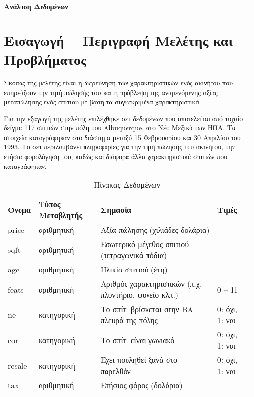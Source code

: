 \documentclass[
  10pt,
]{article}
\author{}
\date{\vspace{-2.5em}}
\begin{document}
\begin{titlepage}
  \centering
  \vspace*{2cm}
  
  {\Huge\bfseries Ανάλυση Δεδομένων\par}
  \vspace{1.5cm}

  \vfill
\end{titlepage}

\section*{Εισαγωγή – Περιγραφή Μελέτης και Προβλήματος}

Σκοπός της μελέτης είναι η διερεύνηση των χαρακτηριστικών ενός ακινήτου
που επηρεάζουν την τιμή πώλησής του και η πρόβλεψη της αναμενόμενης
αξίας μεταπώλησης ενός σπιτιού με βάση τα συγκεκριμένα χαρακτηριστικά.

Για την εξαγωγή της μελέτης επιλέχθηκε σετ δεδομένων που αποτελείται από
τυχαίο δείγμα 117 σπιτιών στην πόλη του Albuquerque, στο Νέο Μεξικό των
ΗΠΑ. Τα στοιχεία καταγράφηκαν στο διάστημα μεταξύ 15 Φεβρουαρίου και 30
Απριλίου του 1993. Το σετ περιλαμβάνει πληροφορίες για την τιμή πώλησης
του ακινήτου, την ετήσια φορολόγηση του, καθώς και διάφορα άλλα
χαρακτηριστικά σπιτιών που καταγράφηκαν.

\begin{longtable}[t]{llll}
\caption{\label{tab:unnamed-chunk-1}Πίνακας Δεδομένων}\\
\toprule
\textbf{Όνομα} & \textbf{Τύπος Μεταβλητής} & \textbf{Σημασία} & \textbf{Τιμές}\\
\midrule
price & αριθμητική & Αξία πώλησης (χιλιάδες δολάρια) & \\
sqft & αριθμητική & Εσωτερικό μέγεθος σπιτιού (τετραγωνικά πόδια) & \\
age & αριθμητική & Ηλικία σπιτιού (έτη) & \\
feats & αριθμητική & Αριθμός χαρακτηριστικών (π.χ. πλυντήριο, ψυγείο κλπ.) & 0 – 11\\
ne & κατηγορική & Το σπίτι βρίσκεται στην ΒΑ πλευρά της πόλης & 0: όχι, 1: ναι\\
\addlinespace
cor & κατηγορική & Το σπίτι είναι γωνιακό & 0: όχι, 1: ναι\\
resale & κατηγορική & Έχει πουληθεί ξανά στο παρελθόν & 0: όχι, 1: ναι\\
tax & αριθμητική & Ετήσιος φόρος (δολάρια) & \\
\bottomrule
\end{longtable}
\end{document}
